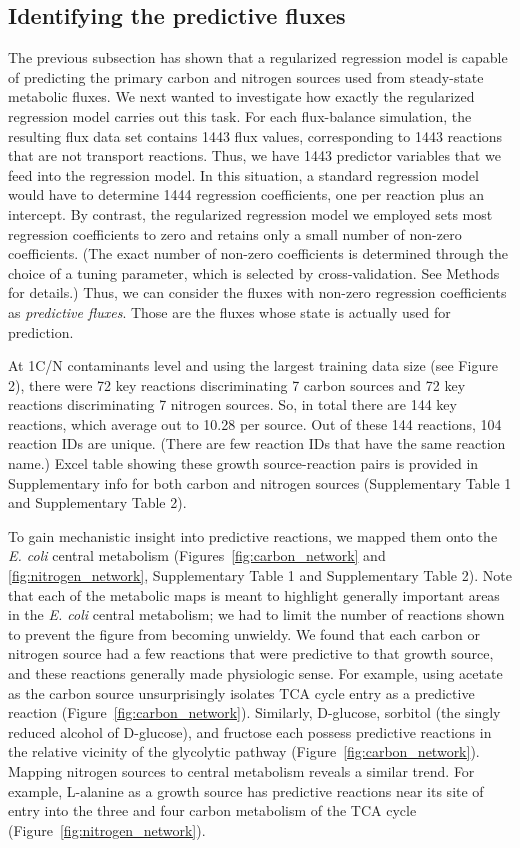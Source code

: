 \documentclass[12pt]{article}
\begin{document}
\subsection*{Identifying the predictive fluxes}

The previous subsection has shown that a regularized regression model is capable of predicting the primary carbon and nitrogen sources used from steady-state metabolic fluxes. We next wanted to investigate how exactly the regularized regression model carries out this task. For each flux-balance simulation, the resulting flux data set contains 1443 flux values, corresponding to 1443 reactions that are not transport reactions. Thus, we have 1443 predictor variables that we feed into the regression model. In this situation, a standard regression model would have to determine 1444 regression coefficients, one per reaction plus an intercept. By contrast, the regularized regression model we employed sets most regression coefficients to zero and retains only a small number of non-zero coefficients. (The exact number of non-zero coefficients is determined through the choice of a tuning parameter, which is selected by cross-validation. See Methods for details.) Thus, we can consider the fluxes with non-zero regression coefficients as \emph{predictive fluxes}. Those are the fluxes whose state is actually used for prediction.

At 1C/N contaminants level and using the largest training data size (see Figure 2), there were 72 key reactions discriminating 7 carbon sources and 72 key reactions discriminating 7 nitrogen sources. So, in total there are 144 key reactions, which average out to 10.28 per source. Out of these 144 reactions, 104 reaction IDs are unique. (There are few reaction IDs that have the same reaction name.) Excel table showing these growth source-reaction pairs is provided in Supplementary info for both carbon and nitrogen sources (Supplementary Table 1 and Supplementary Table 2). 

To gain mechanistic insight into predictive reactions, we mapped them onto the \emph{E. coli} central metabolism (Figures~\ref{fig:carbon_network} and \ref{fig:nitrogen_network}, Supplementary Table 1 and Supplementary Table 2). Note that each of the metabolic maps is meant to highlight generally important areas in the \emph{E. coli} central metabolism; we had to limit the number of reactions shown to prevent the figure from becoming unwieldy. We found that each carbon or nitrogen source had a few reactions that were predictive to that growth source, and these reactions generally made physiologic sense. For example, using acetate as the carbon source unsurprisingly isolates TCA cycle entry as a predictive reaction (Figure~\ref{fig:carbon_network}). Similarly, D-glucose, sorbitol (the singly reduced alcohol of D-glucose), and fructose each possess predictive reactions in the relative vicinity of the glycolytic pathway (Figure~\ref{fig:carbon_network}). Mapping nitrogen sources to central metabolism reveals a similar trend. For example, L-alanine as a growth source has predictive reactions near its site of entry into the three and four carbon metabolism of the TCA cycle (Figure~\ref{fig:nitrogen_network}).
\end{document}
